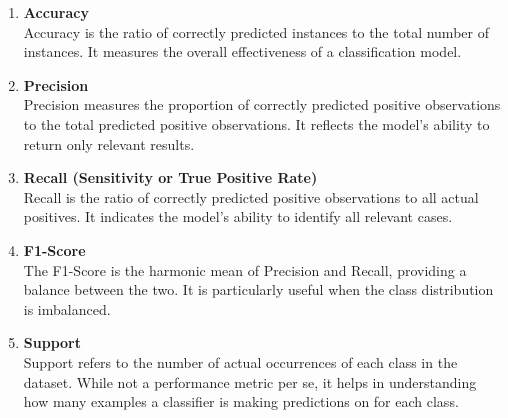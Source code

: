 \begin{enumerate}
  \item \textbf{Accuracy} \\
        Accuracy is the ratio of correctly predicted instances to the total number of instances. It measures the overall effectiveness of a classification model.

  \item \textbf{Precision} \\
        Precision measures the proportion of correctly predicted positive observations to the total predicted positive observations. It reflects the model’s ability to return only relevant results.

  \item \textbf{Recall (Sensitivity or True Positive Rate)} \\
        Recall is the ratio of correctly predicted positive observations to all actual positives. It indicates the model’s ability to identify all relevant cases.

  \item \textbf{F1-Score} \\
        The F1-Score is the harmonic mean of Precision and Recall, providing a balance between the two. It is particularly useful when the class distribution is imbalanced.

  \item \textbf{Support} \\
        Support refers to the number of actual occurrences of each class in the dataset. While not a performance metric per se, it helps in understanding how many examples a classifier is making predictions on for each class.
\end{enumerate}

